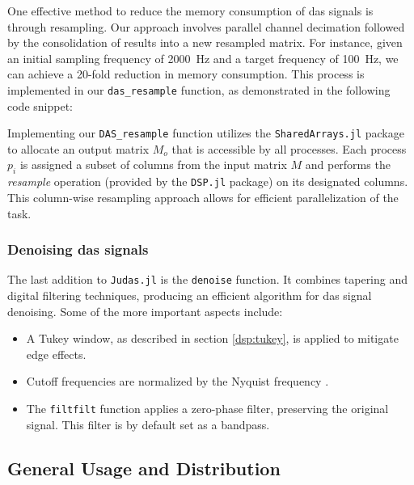 One effective method to reduce the memory consumption of \acrshort{das} signals is through resampling. Our approach involves parallel channel decimation followed by the consolidation of results into a new resampled matrix. For instance, given an initial sampling frequency of \qty{2000}{\hertz} and a target frequency of \qty{100}{\hertz}, we can achieve a 20-fold reduction in memory consumption. This process is implemented in our \texttt{das\_resample} function, as demonstrated in the following code snippet:



Implementing our \texttt{DAS\_resample} function utilizes the \texttt{SharedArrays.jl} package to allocate an output matrix $M_o$ that is accessible by all processes. Each process $p_i$ is assigned a subset of columns from the input matrix $M$ and performs the \textit{resample} operation (provided by the \texttt{DSP.jl} package) on its designated columns. This column-wise resampling approach allows for efficient parallelization of the task.


\subsubsection{Denoising \acrshort{das} signals}



The last addition to \texttt{Judas.jl} is the \texttt{denoise} function. It combines tapering and digital filtering techniques, producing an efficient algorithm for \acrshort{das} signal denoising. Some of the more important aspects include: 

\begin{itemize}
    \item A Tukey window, as described in section \ref{dsp:tukey}, is applied to mitigate edge effects. 
    \item Cutoff frequencies are normalized by the Nyquist frequency \cite{schmogrow2012nyquist}.
    \item The \texttt{filtfilt} function applies a zero-phase filter, preserving the original signal. This filter is by default set as a bandpass. 
\end{itemize}

\subsection{General Usage and Distribution}

